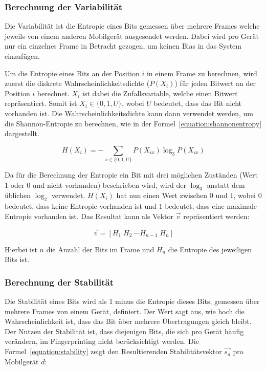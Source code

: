 \clearpage

\subsubsection*{Berechnung der Variabilität}
Die Variabilität ist die Entropie eines Bits gemessen über mehrere Frames
welche jeweils von einem anderen Mobilgerät ausgesendet werden.
Dabei wird pro Gerät nur ein einzelnes Frame in Betracht gezogen, 
um keinen Bias in das System einzufügen.

Um die Entropie eines Bits an der Position $i$ in einem Frame zu berechnen,
wird zuerst die diskrete Wahrscheinlichkeitsdichte ($P(X_{i})$) für 
jeden Bitwert an der Position $i$ berechnet.
$X_{i}$ ist dabei die Zufallsvariable, welche einen Bitwert repräsentiert.
Somit ist $X_{i} \in \{0, 1, U\}$, wobei $U$ bedeutet, dass das Bit nicht 
vorhanden ist.
Die Wahrscheinlichkeitsdichte kann dann verwendet werden, um die 
Shannon-Entropie zu berechnen, wie in der 
Formel~\ref{equation:shannonentropy} dargestellt.

\begin{equation}
    \label{equation:shannonentropy}
    H(X_{i}) = - \sum_{x \in \{0, 1, U\}} P(X_{ix}) \log_{3} P(X_{ix})
\end{equation}

Da für die Berechnung der Entropie ein Bit mit drei möglichen Zuständen
(Wert 1 oder 0 und nicht vorhanden) beschrieben wird, wird der $\log_{3}$
anstatt dem üblichen $\log_{2}$ verwendet.
$H(X_{i})$ hat nun einen Wert zwischen $0$ und $1$, wobei $0$ bedeutet, 
dass keine Entropie vorhanden ist und $1$ bedeutet, dass eine maximale 
Entropie vorhanden ist.
Das Resultat kann als Vektor $\vec{v}$ repräsentiert werden:

\begin{equation}
    \vec{v} = [H_{1}\; H_{2}\; \cdots H_{n-1}\; H_{n}]
\end{equation}

Hierbei ist $n$ die Anzahl der Bits im Frame und $H_{n}$ die Entropie des 
jeweiligen Bits ist.

\subsubsection*{Berechnung der Stabilität}
Die Stabilität eines Bits wird als $1$ minus die Entropie dieses Bits, 
gemessen über mehrere Frames von einem Gerät, definiert.
Der Wert sagt aus, wie hoch die Wahrscheinlichkeit ist, dass das 
Bit über mehrere Übertragungen gleich bleibt.
Der Nutzen der Stabilität ist, dass diejenigen Bits, die sich pro Gerät
häufig verändern, im Fingerprinting nicht berücksichtigt werden.
Die Formel~\ref{equation:stability} zeigt den Resultierenden 
Stabilitätsvektor $\vec{s_{d}}$ pro Mobilgerät $d$:

